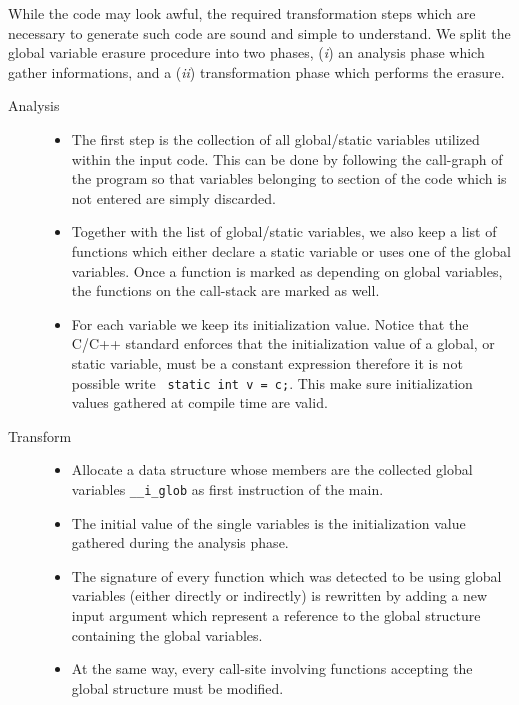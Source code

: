 While the code may look awful, the required transformation steps which are
necessary to generate such code are sound and simple to understand. We split the
global variable erasure procedure into two phases, (\emph{i}) an analysis phase
which gather informations, and a (\emph{ii}) transformation phase which performs
the erasure.
\begin{description}
\item [Analysis]
	\begin{itemize}
	\item The first step is the collection of all global/static variables utilized
	within the input code. This can be done by following the call-graph of the program
	so that variables belonging to section of the code which is not entered are simply
	discarded. 
	
	\item Together with the list of global/static variables, we also keep a list of
	functions which either declare a static variable or uses one of the global
	variables. Once a function is marked as depending on global variables,
	the functions on the call-stack are marked as well.

	\item For each variable we keep its initialization value. Notice that the
	C/C++ standard enforces that the initialization value of a global, or static
	variable, must be a constant expression therefore it is not possible write {\tt
	static int v = c;}. This make sure initialization values gathered at compile
	time are valid.
	\end{itemize}

\item[Transform] 
	\begin{itemize}
	\item Allocate a data structure whose members are the collected global
	variables {\tt \_\_i\_glob} as first instruction of the main.

	\item The initial value of the single variables is the initialization value
	gathered during the analysis phase. 

	\item The signature of every function which was detected to be using global
	variables (either directly or indirectly) is rewritten by adding a new input
	argument which represent a reference to the global structure containing the
	global variables.

	\item At the same way, every call-site involving functions accepting the
	global structure must be modified.	
	\end{itemize}
\end{description}

